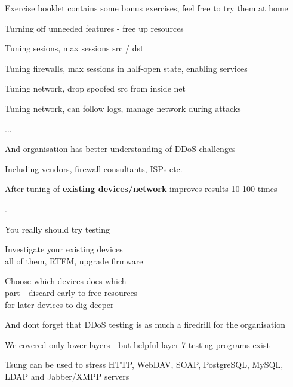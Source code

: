 \documentclass[Screen16to9,17pt]{foils}
\begin{document}



Exercise booklet contains some bonus exercises, feel free to try them at home




\begin{list1}
\item Turning off unneeded features - free up resources
\item Tuning sesions, max sessions src / dst
\item Tuning firewalls, max sessions in half-open state, enabling services
\item Tuning network, drop spoofed src from inside net \smiley
\item Tuning network, can follow logs, manage network during attacks
\item ...
\item And organisation has better understanding of DDoS challenges
\item Including vendors, firewall consultants, ISPs etc.
\end{list1}

\vskip 1cm
\centerline{After tuning of {\bf existing devices/network} improves results 10-100 times}


.
\begin{list1}
\item You really should try testing
\item Investigate your existing devices\\
all of them, RTFM, upgrade firmware
\item Choose which devices does which\\
part - discard early to free resources\\
for later devices to dig deeper
\end{list1}

\vskip 2cm
\centerline{And dont forget that DDoS testing is as much a firedrill for the organisation}



\begin{list1}
\item We covered only lower layers - but helpful layer 7 testing programs exist
\item Tsung can be used to stress HTTP, WebDAV, SOAP, PostgreSQL, MySQL, LDAP and Jabber/XMPP servers 
\end{list1}
\end{document}
